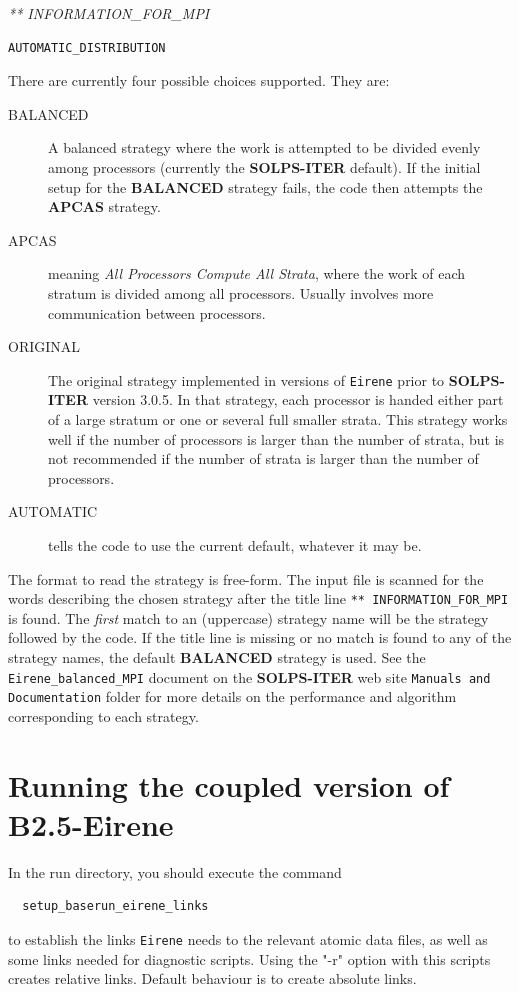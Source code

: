 \documentclass[a4paper,10pt]{report}
\newcommand\SOLPSITER{{\bf SOLPS-ITER} }
\begin{document}
{\it *** INFORMATION\_FOR\_MPI}
\begin{verbatim}
AUTOMATIC_DISTRIBUTION
\end{verbatim}

There are currently four possible choices supported. They are:
\begin{description}
  \item[BALANCED] A balanced strategy where the work is attempted to be divided evenly among processors (currently the \SOLPSITER default). If the initial setup for the {\bf BALANCED} strategy fails, the code then attempts the {\bf APCAS} strategy.
  \item[APCAS] meaning {\it All Processors Compute All Strata}, where the work of each stratum is divided among all processors. Usually involves more communication between processors.
  \item[ORIGINAL] The original strategy implemented in versions of {\tt Eirene} prior to \SOLPSITER version 3.0.5. In that strategy, each processor is handed either part of a large stratum or one or several full smaller strata. This strategy works well if the number of processors is larger than the number of strata, but is not recommended if the number of strata is larger than the number of processors.
  \item[AUTOMATIC] tells the code to use the current default, whatever it may be.
\end{description}
The format to read the strategy is free-form. The input file is scanned for the words describing the chosen strategy after the title line {\tt *** INFORMATION\_FOR\_MPI} is found. The {\em first} match to an (uppercase) strategy name will be the strategy followed by the code. If the title line is missing or no match is found to any of the strategy names, the default {\bf BALANCED} strategy is used. See the {\tt Eirene\_balanced\_MPI} document on the \SOLPSITER web site {\tt Manuals and Documentation} folder for more details on the performance and algorithm corresponding to each strategy.

\chapter{Running the coupled version of B2.5-Eirene}
\label{cha:coupledb2eirene}

In the run directory, you should execute the command
\begin{verbatim}
  setup_baserun_eirene_links
\end{verbatim}
to establish the links {\tt Eirene} needs to the relevant atomic data files,
as well as some links needed for diagnostic scripts.
Using the "-r" option with this scripts creates relative links. Default behaviour is to create absolute links.
\end{document}
